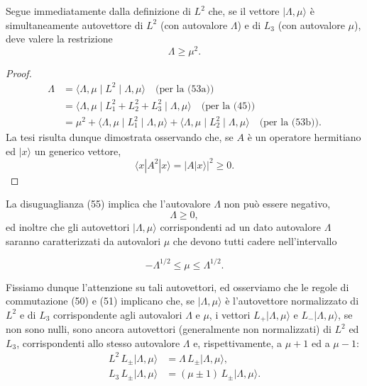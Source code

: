 \documentclass[11pt, a4paper]{book}
\numberwithin{equation}{section}
\begin{document}
Segue immediatamente dalla definizione di $L^2$ che, se il vettore
$|\Lambda,\mu\rangle$ è simultaneamente autovettore di $L^2$ (con autovalore
$\Lambda$) e di $L_3$ (con autovalore $\mu$), deve valere la restrizione
\begin{equation}
\Lambda \geq \mu^2.
\end{equation}

\begin{proof}
\begin{align*}
\Lambda &= \langle \Lambda,\mu \mid L^2 \mid \Lambda,\mu\rangle
  \quad \text{(per la (53a))} \\
  &= \langle \Lambda,\mu \mid L_1^2+L_2^2+L_3^2 \mid \Lambda,\mu\rangle
  \quad \text{(per la (45))} \\
  &= \mu^2 + \langle \Lambda,\mu \mid L_1^2 \mid \Lambda,\mu\rangle
           + \langle \Lambda,\mu \mid L_2^2 \mid \Lambda,\mu\rangle
  \quad \text{(per la (53b))}.
\end{align*}
La tesi risulta dunque dimostrata osservando che, se $A$ è un operatore
hermitiano ed $|x\rangle$ un generico vettore,
\[
\langle x|A^2|x\rangle = |A|x\rangle|^2 \geq 0.
\]
\end{proof}

La disuguaglianza (55) implica che l'autovalore $\Lambda$ non può essere
negativo,
\begin{equation}
\Lambda \geq 0,
\end{equation}
ed inoltre che gli autovettori $|\Lambda,\mu\rangle$ corrispondenti ad un
dato autovalore $\Lambda$ saranno caratterizzati da autovalori $\mu$ che
devono tutti cadere nell'intervallo


\begin{equation}
-\Lambda^{1/2} \leq \mu \leq \Lambda^{1/2}.
\end{equation}

Fissiamo dunque l'attenzione su tali autovettori, ed osserviamo che le
regole di commutazione (50) e (51) implicano che, se $|\Lambda,\mu\rangle$
è l'autovettore normalizzato di $L^2$ e di $L_3$ corrispondente agli
autovalori $\Lambda$ e $\mu$, i vettori $L_+|\Lambda,\mu\rangle$ e
$L_-|\Lambda,\mu\rangle$, se non sono nulli, sono ancora autovettori
(generalmente non normalizzati) di $L^2$ ed $L_3$, corrispondenti allo
stesso autovalore $\Lambda$ e, rispettivamente, a $\mu+1$ ed a $\mu-1$:
\begin{align}
L^2\,L_\pm|\Lambda,\mu\rangle &= \Lambda\,L_\pm|\Lambda,\mu\rangle, \tag{58} \\
L_3\,L_\pm|\Lambda,\mu\rangle &= (\mu\pm1)\,L_\pm|\Lambda,\mu\rangle. \tag{59}
\end{align}
\end{document}
